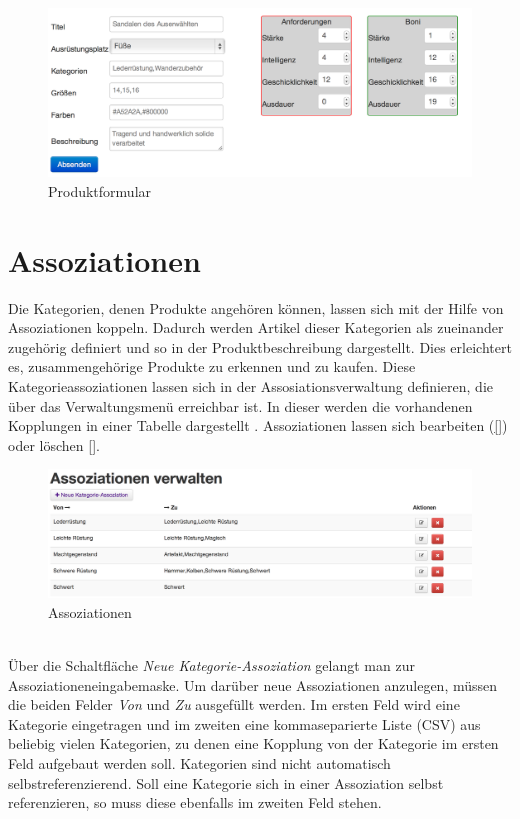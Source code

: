 \begin{figure}[h!]
  \centering
  \includegraphics[width=\textwidth]{img/Produktformular.png}
  \caption{Produktformular}
  \label{fig:Produktformular}
\end{figure}

\section{Assoziationen}
\label{chp:Assoziationen}
Die Kategorien, denen Produkte angehören können, lassen sich mit der Hilfe von Assoziationen koppeln. Dadurch werden Artikel dieser Kategorien als zueinander zu\-ge\-hö\-rig definiert und so in der Produktbeschreibung  dargestellt. Dies erleichtert es, zusammengehörige Produkte zu erkennen und zu kaufen. Diese Kategorieassoziationen lassen sich in der Assosiationsverwaltung definieren, die über das Verwaltungsmenü erreichbar ist. In dieser werden die vorhandenen Kopplungen in einer Tabelle dargestellt . Assoziationen lassen sich bearbeiten (\ref{}) oder löschen \ref{}. \\

\begin{figure}[h!]
  \centering
  \includegraphics[width=\textwidth]{img/Assoziationen.png}
  \caption{Assoziationen}
  \label{fig:Assoziationen}
\end{figure}
\text{}\vspace*{-1em}\\
Über die Schaltfläche \textit{Neue Kategorie-Assoziation} gelangt man zur Asso\-zia\-tionen\-ein\-ga\-be\-mas\-ke. Um darüber neue Assoziationen anzulegen, müssen die beiden Felder \textit{Von} und \textit{Zu} ausgefüllt werden. Im ersten Feld wird eine Kategorie eingetragen und im zweiten eine kommaseparierte Liste (CSV) aus beliebig vielen Kategorien, zu denen eine Kopplung von der Kategorie im ersten Feld aufgebaut werden soll. Kategorien sind nicht automatisch selbstreferenzierend. Soll eine Kategorie sich in einer Assoziation selbst referenzieren, so muss diese ebenfalls im zweiten Feld stehen.


